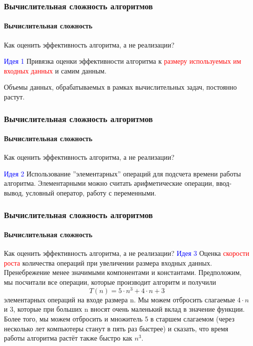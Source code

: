 \documentclass[aspectratio=169]{beamer}
\begin{document}
\begin{frame}
\frametitle{Вычислительная сложность алгоритмов}
\framesubtitle{Вычислительная сложность}
\justifying
Как оценить эффективность алгоритма, а не реализации?\newline\newline

\textcolor{blue}{Идея 1}
Привязка оценки эффективности алгоритма к \textcolor{red}{размеру используемых им входных данных} и самим данным.\newline\newline

Объемы данных, обрабатываемых в рамках вычислительных задач, постоянно растут.

\end{frame}	

\begin{frame}
\frametitle{Вычислительная сложность алгоритмов}
\framesubtitle{Вычислительная сложность}
\justifying
Как оценить эффективность алгоритма, а не реализации?\newline\newline

\textcolor{blue}{Идея 2}
Использование  ”элементарных” операций для подсчета времени работы алгоритма.  Элементарными можно считать арифметические операции, ввод-вывод, условный оператор, работу с переменными.

\end{frame}	

\begin{frame}
\frametitle{Вычислительная сложность алгоритмов}
\framesubtitle{Вычислительная сложность}
\justifying
\small
Как оценить эффективность алгоритма, а не реализации?\newline\newline
\textcolor{blue}{Идея 3}
Оценка \textcolor{red}{скорости роста} количества операций при увеличении размера входных данных. Пренебрежение менее значимыми компонентами и константами.\newline\newline
Предположим, мы посчитали все операции, которые производит алгоритм и получили \newline $$T(n) = 5\cdot n^3 + 4\cdot n + 3$$ элементарных операций на входе размера n. \newline Мы можем отбросить слагаемые $4\cdot n$ и $3$, которые при больших n вносят очень маленький вклад в значение функции. \newline Более того, мы можем отбросить и множитель 5 в старшем слагаемом (через несколько лет компьютеры станут в пять раз быстрее) и сказать, что время работы алгоритма растёт также быстро как $n^3$.

\end{frame}
\end{document}
